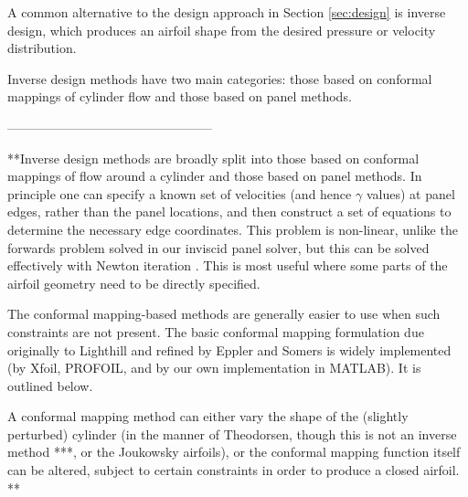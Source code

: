 \documentclass[a4paper,11pt]{article}
\begin{document}
A common alternative to the design approach in Section \ref{sec:design} is inverse design, which produces an airfoil shape from the desired pressure or velocity distribution.

Inverse design methods have two main categories: those based on conformal mappings of cylinder flow and those based on panel methods.

------------------------------------------------

**Inverse design methods are broadly split into those based on conformal mappings of flow around a cylinder and those based on panel methods. In principle one can specify a known set of velocities (and hence $\gamma$ values) at panel edges, rather than the panel locations, and then construct a set of equations to determine the necessary edge coordinates. This problem is non-linear, unlike the forwards problem solved in our inviscid panel solver, but this can be solved effectively with Newton iteration \cite{xfoil}. This is most useful where some parts of the airfoil geometry need to be directly specified.

The conformal mapping-based methods are generally easier to use when such constraints are not present. The basic conformal mapping formulation due originally to Lighthill \cite{lighthill} and refined by Eppler and Somers \cite{epplerandsomers} is widely implemented (by Xfoil, PROFOIL, and by our own implementation in MATLAB). It is outlined below.

A conformal mapping method can either vary the shape of the (slightly perturbed) cylinder (in the manner of Theodorsen, though this is not an inverse method ***, or the Joukowsky airfoils), or the conformal mapping function itself can be altered, subject to certain constraints in order to produce a closed airfoil. **



\printbibliography
\end{document}
